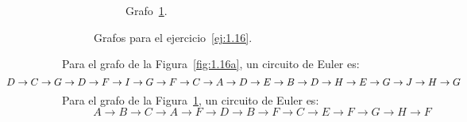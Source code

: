 \begin{ejercicio}
\begin{figure}
\begin{subfigure}[b]{0.4\textwidth}
            \caption{Grafo~\ref{fig:1.16b}.}
            \label{fig:1.16b}
        \end{subfigure}
        
        \caption{Grafos para el ejercicio~\ref{ej:1.16}.}
        \label{fig:1.16}
    \end{figure}

    Para el grafo de la Figura~\ref{fig:1.16a}, un circuito de Euler es:
    \begin{equation*}
        \hspace{-2cm}
        D\to C\to G\to D\to F\to I\to G\to F\to C\to A\to D\to E\to B\to D\to H\to E\to G\to J\to H\to G
    \end{equation*}
    Para el grafo de la Figura~\ref{fig:1.16b}, un circuito de Euler es:
    \begin{equation*}
        A\to B\to C\to A\to F\to D\to B\to F\to C\to E\to F\to G\to H\to F
    \end{equation*}
\end{ejercicio}

